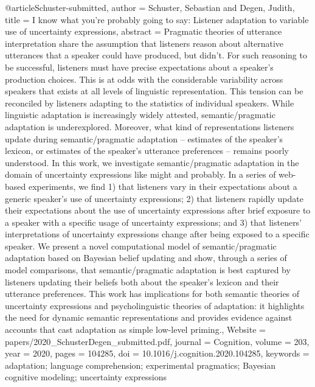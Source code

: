 {@article{Schuster-submitted,
author = {Schuster, Sebastian and Degen, Judith},
title = {{I know what you’re probably going to say: Listener adaptation to variable use of uncertainty expressions}},
abstract = {Pragmatic theories of utterance interpretation share the assumption that listeners reason about alternative utterances that a speaker could have produced, but didn't. For such reasoning to be successful, listeners must have precise expectations about a speaker's production choices. This is at odds with the considerable variability across speakers that exists at all levels of linguistic representation. This tension can be reconciled by listeners adapting to the statistics of individual speakers. While linguistic adaptation is increasingly widely attested, semantic/pragmatic adaptation is underexplored. Moreover, what kind of representations listeners update during semantic/pragmatic adaptation – estimates of the speaker's lexicon, or estimates of the speaker's utterance preferences – remains poorly understood. In this work, we investigate semantic/pragmatic adaptation in the domain of uncertainty expressions like might and probably. In a series of web-based experiments, we find 1) that listeners vary in their expectations about a generic speaker's use of uncertainty expressions; 2) that listeners rapidly update their expectations about the use of uncertainty expressions after brief exposure to a speaker with a specific usage of uncertainty expressions; and 3) that listeners' interpretations of uncertainty expressions change after being exposed to a specific speaker. We present a novel computational model of semantic/pragmatic adaptation based on Bayesian belief updating and show, through a series of model comparisons, that semantic/pragmatic adaptation is best captured by listeners updating their beliefs both about the speaker's lexicon and their utterance preferences. This work has implications for both semantic theories of uncertainty expressions and psycholinguistic theories of adaptation: it highlights the need for dynamic semantic representations and provides evidence against accounts that cast adaptation as simple low-level priming.},
Website = {papers/2020_SchusterDegen_submitted.pdf},
journal = {Cognition},
volume = {203},
year = {2020},
pages = {104285},
doi = {10.1016/j.cognition.2020.104285},
keywords = {adaptation; language comprehension; experimental pragmatics; Bayesian cognitive modeling; uncertainty expressions}
}

}
